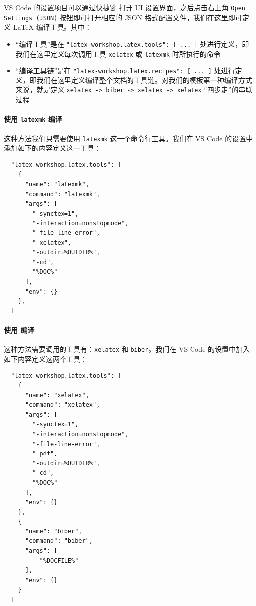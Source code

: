 VS Code 的设置项目可以通过快捷键  打开 UI 设置界面，之后点击右上角 \texttt{Open Settings (JSON)} 按钮即可打开相应的 JSON 格式配置文件，我们在这里即可定义 {\LaTeX} 编译工具。其中：

\begin{itemize}
  \item “编译工具”是在 \texttt{"latex-workshop.latex.tools": [ ... ]} 处进行定义，即我们在这里定义每次调用工具 \texttt{xelatex} 或 \texttt{latexmk} 时所执行的命令
  \item “编译工具链”是在 \texttt{"latex-workshop.latex.recipes": [ ... ]} 处进行定义，即我们在这里定义编译整个文档的工具链。对我们的模板第一种编译方式来说，就是定义 \texttt{xelatex -> biber -> xelatex -> xelatex} “四步走”的串联过程
\end{itemize}

\paragraph{使用 \texttt{latexmk} 编译}

这种方法我们只需要使用 \texttt{latexmk} 这一个命令行工具。我们在 VS Code 的设置中添加如下的内容定义这一工具：

\begin{verbatim}
  "latex-workshop.latex.tools": [
    {
      "name": "latexmk",
      "command": "latexmk",
      "args": [
        "-synctex=1",
        "-interaction=nonstopmode",
        "-file-line-error",
        "-xelatex",
        "-outdir=%OUTDIR%",
        "-cd",
        "%DOC%"
      ],
      "env": {}
    },
  ]
\end{verbatim}

\paragraph{使用  编译}
这种方法需要调用的工具有：\texttt{xelatex} 和 \texttt{biber}。我们在 VS Code 的设置中加入如下内容定义这两个工具：

\begin{verbatim}
  "latex-workshop.latex.tools": [
    {
      "name": "xelatex",
      "command": "xelatex",
      "args": [
        "-synctex=1",
        "-interaction=nonstopmode",
        "-file-line-error",
        "-pdf",
        "-outdir=%OUTDIR%",
        "-cd",
        "%DOC%"
      ],
      "env": {}
    },
    {
      "name": "biber",
      "command": "biber",
      "args": [
          "%DOCFILE%"
      ],
      "env": {}
    }
  ]
\end{verbatim}

